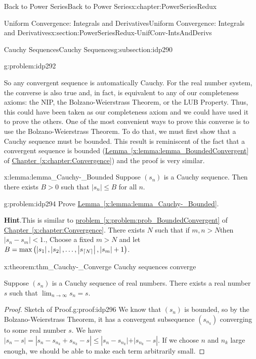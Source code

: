 \begin{chapterptx}{Back to Power Series}{}{Back to Power Series}{}{}{x:chapter:PowerSeriesRedux}
\begin{sectionptx}{Uniform Convergence: Integrals and Derivatives}{}{Uniform Convergence: Integrals and Derivatives}{}{}{x:section:PowerSeriesRedux-UnifConv-IntsAndDerivs}
\begin{subsectionptx}{Cauchy Sequences}{}{Cauchy Sequences}{}{}{g:subsection:idp290}
\begin{problem}{}{g:problem:idp292}
			\end{problem}
			So any convergent sequence is automatically Cauchy. For the real number system, the converse is also true and, in fact, is equivalent to any of our completeness axioms: the NIP, the Bolzano-Weierstrass Theorem, or the LUB Property. Thus, this could have been taken as our completeness axiom and we could have used it to prove the others. One of the most convenient ways to prove this converse is to use the Bolzano-Weierstrass Theorem. To do that, we must first show that a Cauchy sequence must be bounded. This result is reminiscent of the fact that a convergent sequence is bounded (\hyperref[x:lemma:lemma_BoundedConvergent]{Lemma~{\xreffont\ref{x:lemma:lemma_BoundedConvergent}}} of \hyperref[x:chapter:Convergence]{Chapter~{\xreffont\ref{x:chapter:Convergence}}}) and the proof is very similar.%
			\begin{lemma}{}{}{x:lemma:lemma_Cauchy-_Bounded}%
				Suppose \(\left(s_n\right)\) \(\)is a Cauchy sequence. Then there exists \(B>0\) such that \(|s_n|\leq B\) for all \(n\).%
			\end{lemma}
			\begin{problem}{}{g:problem:idp294}%
				Prove \hyperref[x:lemma:lemma_Cauchy-_Bounded]{Lemma~{\xreffont\ref{x:lemma:lemma_Cauchy-_Bounded}}}.%
				\par\smallskip%
				\noindent\textbf{\blocktitlefont Hint}.\hypertarget{g:hint:idp295}{}\quad{}This is similar to \hyperref[x:problem:prob_BoundedConvergent]{problem~{\xreffont\ref{x:problem:prob_BoundedConvergent}}} of \hyperref[x:chapter:Convergence]{Chapter~{\xreffont\ref{x:chapter:Convergence}}}. There exists \(N\) such that if \(m,n>N\)then \(|s_n-s_m|\lt 1.\), Choose a fixed \(m>N\) and let \(B=\max\left(\left|s_1\right|, \left|s_2\right|, \ldots, \left|s_{\lceil N\rceil}\right|, \left|s_m\right|+1\right)\).%
			\end{problem}
			\begin{theorem}{}{}{x:theorem:thm_Cauchy-_Converge}%
				\alert{Cauchy sequences converge}%
				\par
				 Suppose \(\left(s_n\right)\) is a Cauchy sequence of real numbers. There exists a real number \(s\) such that \(\lim_{n\rightarrow\infty}s_n=s\).%
			\end{theorem}
			\begin{proof}{Sketch of Proof.}{g:proof:idp296}
				We know that \(\left(s_n\right)\) \(\)is bounded, so by the Bolzano-Weierstrass Theorem, it has a convergent subsequence \(\left(s_{n_k}\right)\) converging to some real number \(s\). We have \(|s_n-s|=|s_n-s_{n_k}+s_{n_k}-s|\leq|s_n-s_{n_k}\mathopen|+|s_{n_k}-s|\). If we choose \(n\) and \(n_k\) large enough, we should be able to make each term arbitrarily small.%

\end{proof}
\end{subsectionptx}
\end{sectionptx}
\end{chapterptx}
